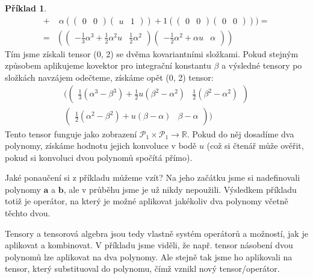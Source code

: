 \documentclass[a5paper,12pt]{amsbook}
\theoremstyle{definition}
\newtheorem{example}{Příklad}[chapter]
\newcommand{\myvec}[1]{\mathbf{#1}}
\begin{document}
\begin{example}
\begin{equation*}
\begin{split}
  + & \;\alpha((\begin{array}{cc}0 & 0\end{array})(\begin{array}{cc}u & 1\end{array}))
  + 1((\begin{array}{cc}0 & 0\end{array})(\begin{array}{cc}0 & 0\end{array}))
)
= \\ = &
((\begin{array}{cc}-\frac{1}{3}\alpha^3 + \frac{1}{2}\alpha^2u & \frac{1}{2}\alpha^2\end{array})
  (\begin{array}{cc}-\frac{1}{2}\alpha^2 + \alpha u & \alpha\end{array}))
\end{split}
\end{equation*}
Tím jsme získali tensor (0, 2) se dvěma kovariantními složkami. Pokud stejným způsobem aplikujeme
kovektor pro integrační konstantu $\beta$ a výsledné tensory po složkách navzájem odečteme, získáme
opět (0, 2) tensor:
\begin{equation*}
\begin{split}
((\begin{array}{cc}\frac{1}{3}(\alpha^3 - \beta^3) + \frac{1}{2}u(\beta^2 - \alpha^2) & \frac{1}{2}(\beta^2 - \alpha^2)\end{array}) \\
  (\begin{array}{cc}\frac{1}{2}(\alpha^2 - \beta^2) + u(\beta - \alpha) & \beta - \alpha\end{array}))
\end{split}
\end{equation*}
Tento tensor funguje jako zobrazení $\mathcal{P}_1\times\mathcal{P}_1\rightarrow\mathbb{R}$. Pokud do něj
dosadíme dva polynomy, získáme hodnotu jejich konvoluce v bodě $u$ (což si čtenář může ověřit, pokud si
konvoluci dvou polynomů spočítá přímo).

\end{example}

\noindent
Jaké ponaučení si z příkladu můžeme vzít? Na jeho začátku jsme si nadefinovali polynomy $\myvec{a}$
a $\myvec{b}$, ale v průběhu jsme je už nikdy nepoužili. Výsledkem příkladu totiž je operátor, na
který je možné aplikovat jakékoliv dva polynomy včetně těchto dvou.

Tensory a tensorová algebra jsou tedy vlastně systém operátorů a možností, jak je aplikovat a kombinovat.
V příkladu jsme viděli, že např. tensor násobení dvou polynomů lze aplikovat na dva polynomy. Ale stejně
tak jsme ho aplikovali na tensor, který substituoval do polynomu, čímž vznikl nový tensor/operátor.
\end{document}
